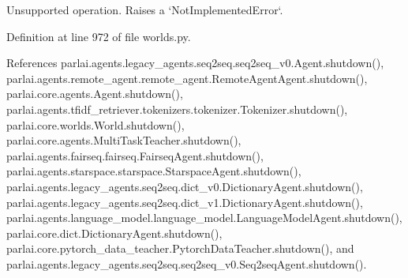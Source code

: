\begin{DoxyVerb}Unsupported operation. Raises a `NotImplementedError`.\end{DoxyVerb}
 

Definition at line 972 of file worlds.\+py.



References parlai.\+agents.\+legacy\+\_\+agents.\+seq2seq.\+seq2seq\+\_\+v0.\+Agent.\+shutdown(), parlai.\+agents.\+remote\+\_\+agent.\+remote\+\_\+agent.\+Remote\+Agent\+Agent.\+shutdown(), parlai.\+core.\+agents.\+Agent.\+shutdown(), parlai.\+agents.\+tfidf\+\_\+retriever.\+tokenizers.\+tokenizer.\+Tokenizer.\+shutdown(), parlai.\+core.\+worlds.\+World.\+shutdown(), parlai.\+core.\+agents.\+Multi\+Task\+Teacher.\+shutdown(), parlai.\+agents.\+fairseq.\+fairseq.\+Fairseq\+Agent.\+shutdown(), parlai.\+agents.\+starspace.\+starspace.\+Starspace\+Agent.\+shutdown(), parlai.\+agents.\+legacy\+\_\+agents.\+seq2seq.\+dict\+\_\+v0.\+Dictionary\+Agent.\+shutdown(), parlai.\+agents.\+legacy\+\_\+agents.\+seq2seq.\+dict\+\_\+v1.\+Dictionary\+Agent.\+shutdown(), parlai.\+agents.\+language\+\_\+model.\+language\+\_\+model.\+Language\+Model\+Agent.\+shutdown(), parlai.\+core.\+dict.\+Dictionary\+Agent.\+shutdown(), parlai.\+core.\+pytorch\+\_\+data\+\_\+teacher.\+Pytorch\+Data\+Teacher.\+shutdown(), and parlai.\+agents.\+legacy\+\_\+agents.\+seq2seq.\+seq2seq\+\_\+v0.\+Seq2seq\+Agent.\+shutdown().


